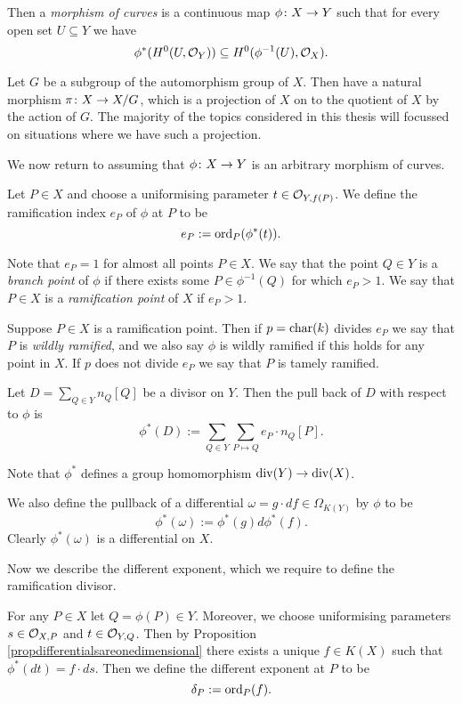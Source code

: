 Then a \emph{morphism of curves} is a continuous map $\phi \colon X \rightarrow Y$ such that for every open set $U \subseteq Y$ we have
    \[
    \phi^*(H^0(U,{\cal O}_Y)) \subseteq H^0(\phi^{-1}(U),{\cal O}_X).
    \]

Let $G$ be a subgroup of the automorphism group of $X$.
Then have a natural morphism $\pi \colon X \rightarrow X/G$, which is a projection of $X$ on to the quotient of $X$ by the action of $G$.
The majority of the topics considered in this thesis will focussed on situations where we have such a projection.

We now return to assuming that $\phi \colon X \rightarrow Y$ is an arbitrary morphism of curves.
    \begin{defn}
    Let $P \in X$ and choose a uniformising parameter $t \in {\cal O}_{Y,f(P)}$.
    We define the ramification index $e_P$ of $\phi$ at $P$ to be
        \[
        e_P := \operatorname{ord}_P(\phi^*(t)).
        \]
    \end{defn}

Note that $e_P =1$ for almost all points $P \in X$.
We say that the point $Q \in Y$ is a \emph{branch point} of $\phi$ if there exists some $P \in \phi^{-1}(Q)$ for which $e_P >1$.
We say that $P \in X$ is a \emph{ramification point} of $X$ if $e_P >1$.

    
Suppose $P \in X$ is a ramification point.
Then if $p = \operatorname{char}(k)$ divides $e_P$ we say that $P$ is \emph{wildly ramified}, and we also say $\phi$ is wildly ramified if this holds for any point in $X$.
If $p$ does not divide $e_P$ we say that $P$ is tamely ramified.

    \begin{defn}
    Let $D = \sum_{Q \in Y}n_Q [Q]$ be a divisor on $Y$.
    Then the pull back of $D$ with respect to $\phi$ is
        \[
        \phi^*(D) := \sum_{Q \in Y} \sum_{P \mapsto Q} e_P \cdot n_Q [P].
        \]
    \end{defn}

Note that $\phi^*$ defines a group homomorphism $\operatorname{div}(Y) \rightarrow \operatorname{div}(X)$.


We also define the pullback of a differential $\omega = g\cdot df \in \Omega_{K(Y)}$ by $\phi$ to be
    \[
    \phi^*(\omega) := \phi^*(g)d\phi^*(f).
    \]
Clearly $\phi^*(\omega)$ is a differential on $X$.


Now we describe the different exponent, which we require to define the ramification divisor.
    \begin{defn}\label{definitiondifferent}
    For any $P\in X$ let $Q = \phi(P) \in Y$.
    Moreover, we choose uniformising parameters $s \in {\cal O}_{X,P}$ and $t \in {\cal O}_{Y,Q}$.
    Then by Proposition \ref{propdifferentialsareonedimensional} there exists a unique $f \in K(X)$ such that $\phi^*(dt) = f\cdot ds$.
    Then we define the different exponent at $P$ to be 
        \[
        \delta_P : = \operatorname{ord}_P(f).
        \]
    \end{defn}

